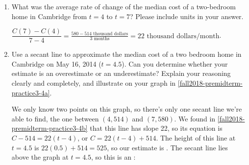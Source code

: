 \documentclass{article}
\theoremstyle{theorem}
\begin{document}
\begin{enumerate}
\begin{enumerate}
  \item \label{fall2018-premidterm-practice3-4b}
    \begin{problem}[\vfill\newpage]
      What was the average rate of change of the median cost of a two-bedroom home in Cambridge from $t=4$ to $t = 7$? Please include units in your answer.
    \end{problem}

    \begin{solution}
      $\displaystyle \dfrac{C(7) - C(4)}{7-4} = \frac{580-514 \text{ thousand dollars}}{3 \text{ months}} = \boxed{22 \text{ thousand dollars/month}}$.
    \end{solution} 

  \item
    \begin{problem}[\vfill]
      Use a secant line to approximate the median cost of a two bedroom home in Cambridge on May 16, 2014 ($t = 4.5$). Can you determine whether your estimate is an overestimate or an underestimate? Explain your reasoning clearly and completely, and illustrate on your graph in \ref{fall2018-premidterm-practice3-4a}.
    \end{problem}

    \begin{solution}
      We only know two points on this graph, so there's only one secant line we're able to find, the one between $(4, 514)$ and $(7, 580)$. We found in \ref{fall2018-premidterm-practice3-4b} that this line has slope 22, so its equation is $C - 514 = 22 (t - 4)$, or $C = 22 (t - 4) + 514$. The height of this line at $t = 4.5$ is $22 (0.5) + 514 = 525$, so our estimate is . The secant line lies above the graph at $t = 4.5$, so this is an :
      \begin{center}
      \end{center}
    \end{solution} 


\end{enumerate}
\end{enumerate}
\end{document}
